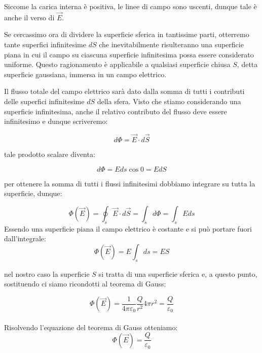 Siccome la carica interna è positiva, le linee di campo sono uscenti, dunque tale è anche il verso di $\vec{E}$.

Se cercassimo ora di dividere la superficie sferica in tantissime parti, otterremo tante superfici infinitesime $dS$ che inevitabilmente risulteranno una superficie piana in cui il campo su ciascuna superficie infinitesima possa essere considerato uniforme. Questo ragionamento è applicabile a qualsiasi superficie chiusa $S$, detta superficie gaussiana, immersa in un campo elettrico.

Il flusso totale del campo elettrico sarà dato dalla somma di tutti i contributi delle superfici infinitesime $dS$ della sfera.
Visto che stiamo considerando una superficie infinitesima, anche il relativo contributo del flusso deve essere infinitesimo e dunque scriveremo:

\begin{equation*}
    d\Phi = \vec{E}\cdot d\vec{S}
\end{equation*}

tale prodotto scalare diventa:

\begin{equation*}
    d\Phi = Eds\cos{0} = EdS
\end{equation*}

per ottenere la somma di tutti i flussi infinitesimi dobbiamo integrare su tutta la superficie, dunque:

\begin{equation*}
    \Phi(\vec{E}) = \oint_s \vec{E}\cdot d\vec{S} = \int_s d\Phi = \int_s Eds
\end{equation*}
Essendo una superficie piana il campo elettrico è costante e si può portare fuori dall'integrale:
\begin{equation*}
    \Phi(\vec{E})  = E\int_s ds  = ES
\end{equation*}

nel nostro caso la superficie $S$ si tratta di una superficie sferica e, a questo punto,  sostituendo ci siamo ricondotti al teorema di Gauss:

\begin{equation}
    \Phi(\vec{E}) = \frac{1}{4\pi\varepsilon_0}\frac{Q}{r^2}4\pi r^2 = \frac{Q}{\varepsilon_0}
\end{equation}

\paragraph{}
Risolvendo l'equazione del teorema di Gauss otteniamo:
\begin{equation*}
     \Phi(\vec{E}) = \frac{Q}{\varepsilon_0}
\end{equation*}

